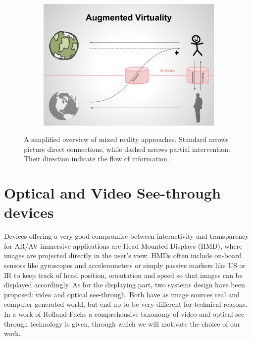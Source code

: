 \begin{figure}
\begin{subfigure}{0.49\textwidth}
\end{subfigure}
\begin{subfigure}{0.49\textwidth}
\centering
\includegraphics[scale=0.13]{schemas/augmentedvirtuality}
\end{subfigure}
\caption{A simplified overview of mixed reality approaches. Standard arrows picture direct connections, while dashed arrows partial intervention. Their direction indicate the flow of information.}
\label{fig:mixed_reality}
\end{figure}

\section{Optical and Video See-through devices} %
Devices offering a very good compromise between interactivity and transparency for AR/AV immersive applications are Head Mounted Displays (HMD), where images are projected directly in the user’s view. HMDs often include on-board sensors like gyroscopes and accelerometers or simply passive markers like US or IR to keep track of head position, orientation and speed so that images can be displayed accordingly. As for the displaying part, two systems design have been proposed: video and optical see-through. Both have as image sources real and computer-generated world, but end up to be very different for technical reasons. In a work of Rolland-Fuchs \cite{optical_vs_video_st} a comprehensive taxonomy of video and optical see-through technology is given, through which we will motivate the choice of our work.

